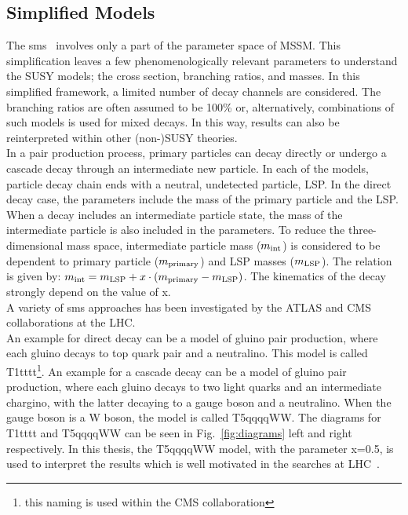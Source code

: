 \subsection{Simplified Models}
\label{sec:simplifiedModels}
The \acrshort{sms}~\cite{SMS} involves only a part of the parameter space of MSSM.  This simplification leaves a few phenomenologically relevant parameters to understand the SUSY models; the cross section, branching ratios, and masses.  In this simplified framework, a limited number of decay channels are considered. The branching ratios are often assumed to be 100\% or, alternatively, combinations of such models is used for mixed decays. In this way, results can also be reinterpreted within other (non-)SUSY theories.\\
In a pair production process, primary particles can decay directly or undergo a cascade decay through an intermediate new particle. In each of the models, particle decay chain ends with a neutral, undetected particle, LSP. In the direct decay case, the parameters include the mass of the primary particle and the LSP. When a decay includes an intermediate particle state, the mass of the intermediate particle is also included in the parameters. To reduce the three-dimensional mass space, intermediate particle mass ($m_{\rm int}$) is considered to be dependent to primary particle ($m_{\rm primary}$) and LSP masses ($m_{\rm LSP}$). The relation is given by: $m_{\rm int} = m_{\rm LSP} + x\cdot(m_{\rm primary} - m_{\rm LSP})$. The kinematics of the decay strongly depend on the value of x.\\
A variety of \acrshort{sms} approaches has been investigated by the ATLAS and CMS collaborations at the LHC.\\
An example for direct decay can be a model of gluino pair production, where each gluino decays to top quark pair and a neutralino. This model is called T1tttt\footnote{this naming is used within the CMS collaboration}. An example for a cascade decay can be a model of gluino pair production, where each gluino decays to two light quarks and an intermediate chargino, with the latter decaying to a gauge boson and a neutralino. When the gauge boson is a W boson, the model is called T5qqqqWW. The diagrams for T1tttt and T5qqqqWW can be seen in Fig.~\ref{fig:diagrams} left and right respectively. In this thesis, the T5qqqqWW model, with the parameter x=0.5, is used to interpret the results which is well motivated in the searches at LHC~\cite{t51,Psms4}.\\   
